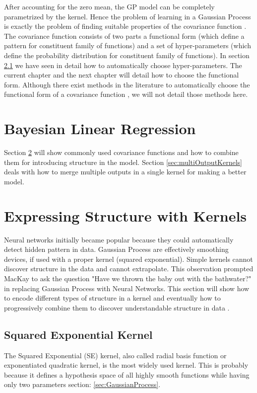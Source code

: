 After accounting for the zero mean, the GP model can be completely parametrized by the kernel. Hence the problem of learning in a Gaussian Process is exactly the problem of finding suitable properties of the covariance function \cite{rasmussen2006gaussian}. The covariance function consists of two parts a functional form (which define a pattern for constituent family of functions) and a set of hyper-parameters (which define the probability distribution for constituent family of functions). In section \ref{} we have seen in detail how to automatically choose hyper-parameters. The current chapter and the next chapter will detail how to choose the functional form. Although there exist methods in the literature to automatically choose the functional form of a covariance function \cite{duvenaud-thesis-2014, lloyd2014automatic, automaticStatistician}, we will not detail those methods here. 

\section{Bayesian Linear Regression}




Section \ref{sec:covStructure} will show commonly used covariance functions and how to combine them for introducing structure in the model. Section \ref{sec:multiOutputKernels} deals with how to merge multiple outputs in a single kernel for making a better model.

\section{Expressing Structure with Kernels} \label{sec:covStructure}
Neural networks initially became popular because they could automatically detect hidden pattern in data. Gaussian Process are effectively smoothing devices, if used with a proper kernel (squared exponential). Simple kernels cannot discover structure in the data and cannot extrapolate. This observation prompted MacKay \cite{mackay2003information} to ask the question "Have we thrown the baby out with the bathwater?" in replacing Gaussian Process with Neural Networks. This section will show how to encode different types of structure in a kernel and eventually how to progressively combine them to discover understandable structure in data \cite{duvenaud-thesis-2014}.



\subsection{Squared Exponential Kernel}
The Squared Exponential (SE) kernel, also called radial basis function or exponentiated quadratic kernel, is the most widely used kernel. This is probably because it defines a hypothesis space of all highly smooth functions while having only two parameters section: \ref{sec:GaussianProcess}.

